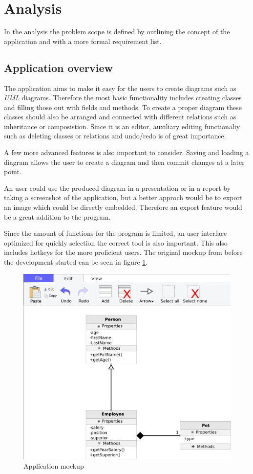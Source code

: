 \section{Analysis}
In the analysis the problem scope is defined by outlining the concept of the
application and with a more formal requirement list. 

\subsection{Application overview}
The application aims to make it easy for the users to create diagrams such as
\textit{UML} diagrams. Therefore the most basic functionality includes creating
classes and filling those out with fields and methods. To create a proper
diagram these classes should also be arranged and connected with different
relations such as inheritance or composistion. Since it is an editor, auxiliary
editing functionaliy such as deleting classes or relations and undo/redo is
of great importance. 

A few more advanced features is also important to consider. Saving and loading a
diagram allows the user to create a diagram and then commit changes at a later
point.

An user could use the produced diagram in a presentation or in a report by
taking a screenshot of the application, but a better approch would be to export
an image which could be directly embedded. Therefore an export feature would be
a great addition to the program. 

Since the amount of functions for the program is limited, an user interface
optimized for quickly selection the correct tool is also important. This also
includes hotkeys for the more proficient users. The original mockup from before
the development started can be seen in figure \ref{mockup}.
\begin{figure}[H]
\centering
\includegraphics[width=\linewidth]{img/mockup}
\caption{Application mockup \label{mockup}}
\end{figure}

